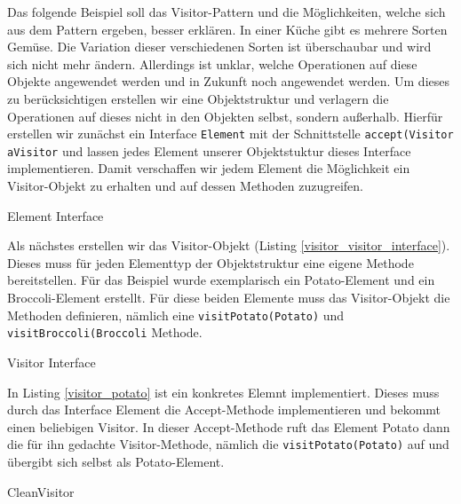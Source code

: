 
Das folgende Beispiel soll das Visitor-Pattern und die Möglichkeiten, welche sich aus dem Pattern ergeben, besser erklären. In einer Küche gibt es mehrere Sorten Gemüse. Die Variation dieser verschiedenen Sorten ist überschaubar und wird sich nicht mehr ändern. Allerdings ist unklar, welche Operationen auf diese Objekte angewendet werden und in Zukunft noch angewendet werden. Um dieses zu berücksichtigen erstellen wir eine Objektstruktur und verlagern die Operationen auf dieses nicht in den Objekten selbst, sondern außerhalb. Hierfür erstellen wir zunächst ein Interface \texttt{Element} mit der Schnittstelle \texttt{accept(Visitor aVisitor} und lassen jedes Element unserer Objektstuktur dieses Interface implementieren. Damit verschaffen wir jedem Element die Möglichkeit ein Visitor-Objekt zu erhalten und auf dessen Methoden zuzugreifen.


\begin{listing}[h!]
   \centering
   \caption{Element Interface}
    \label{visitor_element_interface}
\end{listing}  

Als nächstes erstellen wir das Visitor-Objekt (Listing \ref{visitor_visitor_interface}). Dieses muss für jeden Elementtyp der Objektstruktur eine eigene Methode bereitstellen. Für das Beispiel wurde exemplarisch ein Potato-Element und ein Broccoli-Element erstellt. Für diese beiden Elemente muss das Visitor-Objekt die Methoden definieren, nämlich eine \texttt{visitPotato(Potato)} und \texttt{visitBroccoli(Broccoli} Methode.


\begin{listing}[h!]
   \centering
   \caption{Visitor Interface}
    \label{visitor_visitor_interface}
\end{listing}  

In Listing \ref{visitor_potato} ist ein konkretes Elemnt implementiert. Dieses muss durch das Interface Element die Accept-Methode implementieren und bekommt einen beliebigen Visitor.
In dieser Accept-Methode ruft das Element Potato dann die für ihn gedachte Visitor-Methode, nämlich die \texttt{visitPotato(Potato)} auf und übergibt sich selbst als Potato-Element.

\begin{listing}[h!]
   \centering
   \caption{CleanVisitor}
    \label{visitor_potato}
\end{listing}  

